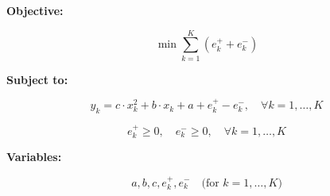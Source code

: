 \documentclass{article}
\begin{document}
\textbf{Objective:}

\[
\min \sum_{k=1}^{K} (e_k^+ + e_k^-)
\]

\textbf{Subject to:}

\[
y_k = c \cdot x_k^2 + b \cdot x_k + a + e_k^+ - e_k^-, \quad \forall k = 1, \ldots, K
\]

\[
e_k^+ \geq 0, \quad e_k^- \geq 0, \quad \forall k = 1, \ldots, K
\]

\textbf{Variables:}

\[
a, b, c, e_k^+, e_k^- \quad \text{(for } k = 1, \ldots, K\text{)}
\]
\end{document}
